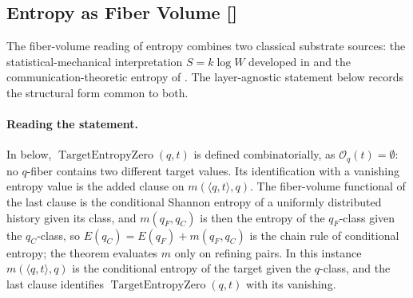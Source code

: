 \subsection{Entropy as Fiber Volume [\texorpdfstring{}{F39}]}\label{sec:self-reference-limits:entropy}

The fiber-volume reading of entropy combines two classical substrate
sources: the statistical-mechanical interpretation
\(S=k\log W\) developed in \citet{Boltzmann1877Beziehung} and the
communication-theoretic entropy of \citet{Shannon1948Mathematical}.
The layer-agnostic statement below records the structural form
common to both.

\paragraph{Reading the statement.} In  below,
\(\operatorname{TargetEntropyZero}(q,t)\) is defined combinatorially,
as \(\mathcal O_q(t)=\emptyset\): no \(q\)-fiber contains two different
target values.  Its identification with a vanishing entropy value is
the added clause on \(m(\langle q,t\rangle,q)\).  The fiber-volume
functional of the last clause is the conditional Shannon entropy of a
uniformly distributed history given its class, and \(m(q_F,q_C)\) is
then the entropy of the \(q_F\)-class given the \(q_C\)-class, so
\(E(q_C)=E(q_F)+m(q_F,q_C)\) is the chain rule of conditional entropy;
the theorem evaluates \(m\) only on refining pairs.  In this instance
\(m(\langle q,t\rangle,q)\) is the conditional entropy of the target
given the \(q\)-class, and the last clause identifies
\(\operatorname{TargetEntropyZero}(q,t)\) with its vanishing.

